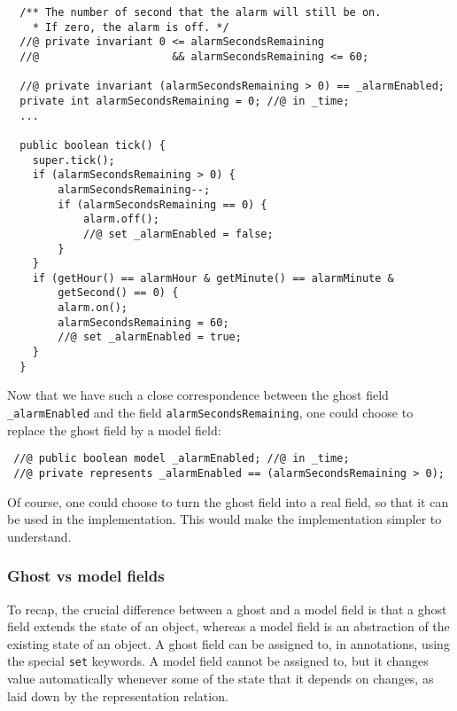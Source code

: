 \documentclass{llncs}
\begin{document}
\begin{verbatim}
  /** The number of second that the alarm will still be on.
    * If zero, the alarm is off. */
  //@ private invariant 0 <= alarmSecondsRemaining 
  //@                     && alarmSecondsRemaining <= 60;

  //@ private invariant (alarmSecondsRemaining > 0) == _alarmEnabled;
  private int alarmSecondsRemaining = 0; //@ in _time;
  ...

  public boolean tick() {
    super.tick();
    if (alarmSecondsRemaining > 0) {
        alarmSecondsRemaining--;
        if (alarmSecondsRemaining == 0) {
            alarm.off();
            //@ set _alarmEnabled = false;
        }
    }
    if (getHour() == alarmHour & getMinute() == alarmMinute &
        getSecond() == 0) {
        alarm.on();
        alarmSecondsRemaining = 60;
        //@ set _alarmEnabled = true;
    }
  }
\end{verbatim}
Now that we have such a close correspondence between the
ghost field \texttt{\_alarmEnabled} and the field
\texttt{alarmSecondsRemaining}, one could choose to replace
the ghost field by a model field:
\begin{verbatim}
 //@ public boolean model _alarmEnabled; //@ in _time;
 //@ private represents _alarmEnabled == (alarmSecondsRemaining > 0);
\end{verbatim}
%
Of course, one could choose to turn the ghost field into a real field,
so that it can be used in the implementation.
This would make the implementation simpler to understand.

\subsubsection*{Ghost vs model fields}

To recap, the crucial difference between a ghost and a model field 
is that a ghost field extends the state of an object, whereas
a model field is an abstraction of the existing state of an object.
A ghost field can be assigned to, in annotations, using the
special \texttt{set} keywords.
A model field cannot be assigned to, but it changes value automatically
whenever some of the state that it depends on changes, as laid down
by the representation relation.

% 
% 
% 
\end{document}
